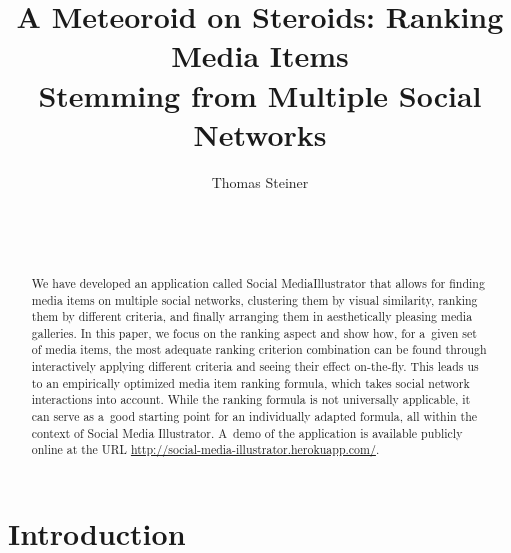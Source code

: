 \documentclass{sig-alternate}
\newcommand{\inlinelistingsize}{\fontsize{8pt}{11pt}}
\let\oldurl\url
\renewcommand{\url}[1]{\inlinelistingsize\oldurl{#1}}
\begin{document}


\title{A Meteoroid on Steroids: Ranking Media Items\\ Stemming from Multiple Social Networks}

\author{
\alignauthor
Thomas Steiner\\
	\\
	\\
	\\
}
\maketitle

\begin{abstract}
We have developed an application called Social Media\linebreak Illustrator
that allows for finding media items on multiple social networks,
clustering them by visual similarity, ranking them by different criteria,
and finally arranging them in aesthetically pleasing media galleries.
In this paper, we focus on the ranking aspect and show how,
for a~given set of media items, the most adequate ranking criterion combination
can be found through interactively applying different criteria
and seeing their effect on-the-fly.
This leads us to an empirically optimized media item ranking formula,
which takes social network interactions into account.
While the ranking formula is not universally applicable,
it can serve as a~good starting point for an individually adapted formula,
all within the context of Social Media Illustrator.
A~demo of the application is available publicly online at the URL
\url{http://social-media-illustrator.herokuapp.com/}.
\end{abstract}



\keywords{}

\section{Introduction}
\end{document}
